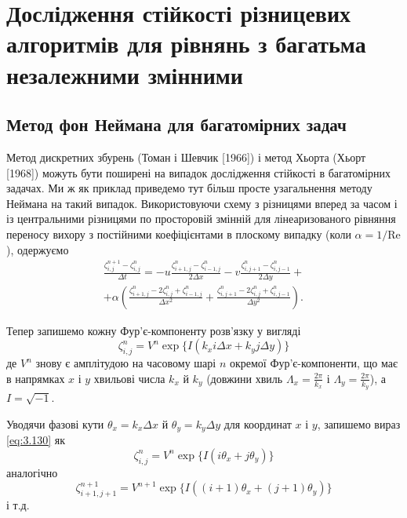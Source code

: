 \chapter{Дослідження стійкості різницевих алгоритмів для рівнянь з багатьма незалежними змінними}


\section{Метод фон Неймана для багатомірних задач}

Метод дискретних збурень (Томан і Шевчик [1966]) і метод Хьорта (Хьорт [1968]) можуть бути поширені на випадок дослідження стійкості в багатомірних задачах. Ми ж як приклад приведемо тут більш просте узагальнення методу Неймана на такий випадок. Використовуючи схему з різницями вперед за часом і із центральними різницями по просторовій змінній для лінеаризованого рівняння переносу вихору з постійними коефіцієнтами в плоскому випадку (коли $\alpha = 1 / \text{Re}$), одержуємо
\begin{multline}
    \label{eq:3.129}
    \frac{\zeta_{i, j}^{n + 1} - \zeta_{i, j}^n}{\Delta t} = -u \frac{\zeta_{i + 1, j}^n - \zeta_{i - 1, j}^n}{2 \Delta x} - v \frac{\zeta_{i, j + 1}^n - \zeta_{i, j - 1}^n}{2 \Delta y} + \\ + \alpha \left( \frac{\zeta_{i + 1, j}^n - 2 \zeta_{i, j}^n + \zeta_{i - 1, j}^n}{\Delta x^2} + \frac{\zeta_{i, j + 1}^n - 2 \zeta_{i, j}^n + \zeta_{i, j - 1}^n}{\Delta y^2} \right).
\end{multline}

Тепер запишемо кожну Фур'є-компоненту розв'язку у вигляді
\begin{equation}
    \label{eq:3.130}
    \zeta_{i, j}^n = V^n \exp\{ I (k_x i \Delta x + k_y j \Delta y) \}
\end{equation}
де $V^n$ знову є амплітудою на часовому шарі $n$ окремої Фур'є-компоненти, що має в напрямках $x$ і $y$ хвильові числа $k_x$ й $k_y$ (довжини хвиль $\Lambda_x = \frac{2 \pi}{k_x}$ і $\Lambda_y = \frac{2 \pi}{k_y}$), а $I = \sqrt{-1}$. \medskip

Уводячи фазові кути $\theta_x = k_x \Delta x$ й $\theta_y = k_y \Delta y$ для координат $x$ і $y$, запишемо вираз \eqref{eq:3.130} як
\begin{equation}
    \label{eq:3.131}
    \zeta_{i, j}^n = V^n \exp\{ I (i \theta_x + j \theta_y) \}
\end{equation}
аналогічно
\begin{equation}
    \label{eq:3.132}
    \zeta_{i + 1, j + 1}^{n + 1} = V^{n + 1} \exp\{ I ((i + 1) \theta_x + (j + 1) \theta_y)\}
\end{equation}
і т.д. 

